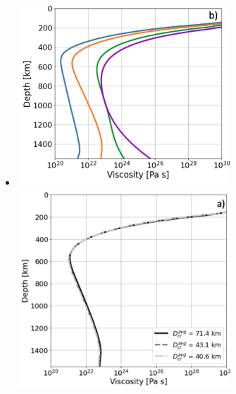 \begin{itemize}
\item {}

\begin{center}
\includegraphics[width=8cm]{images/mars/viscosity/plwk22a}
\includegraphics[width=8cm]{images/mars/viscosity/plwk22d}
\end{center} 



\end{itemize}


